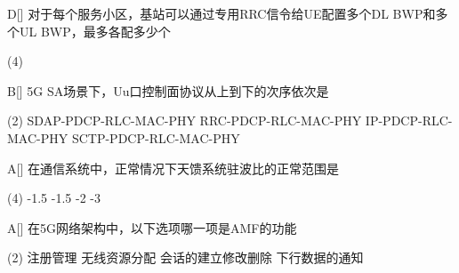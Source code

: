 
\begin{choice}{D}[]
	对于每个服务小区，基站可以通过专用RRC信令给UE配置多个DL BWP和多个UL BWP，最多各配多少个
	\begin{tasks}(4)
	\end{tasks}
\end{choice}

\begin{choice}{B}[]
	5G SA场景下，Uu口控制面协议从上到下的次序依次是
	\begin{tasks}(2)
		\task SDAP-PDCP-RLC-MAC-PHY
		\task RRC-PDCP-RLC-MAC-PHY
		\task IP-PDCP-RLC-MAC-PHY
		\task SCTP-PDCP-RLC-MAC-PHY
	\end{tasks}
\end{choice}




\begin{choice}{A}[]
	在通信系统中，正常情况下天馈系统驻波比的正常范围是
	\begin{tasks}(4)
		-1.5
		-1.5
		-2
		-3
	\end{tasks}
\end{choice}


\begin{choice}{A}[]
	在5G网络架构中，以下选项哪一项是AMF的功能
	\begin{tasks}(2)
		\task 注册管理
		\task 无线资源分配
		\task 会话的建立修改删除
		\task 下行数据的通知
	\end{tasks}
\end{choice}


